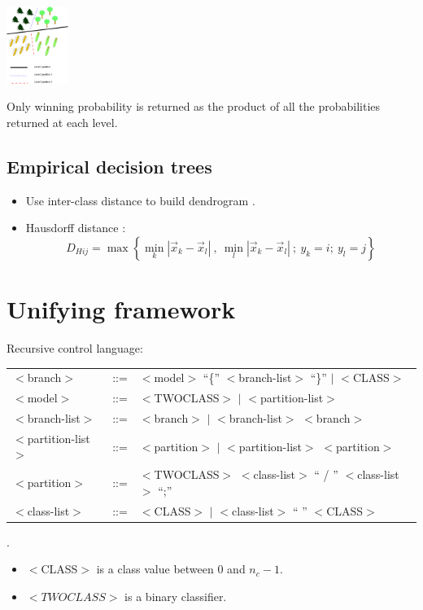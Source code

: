 \documentclass[a0,landscape]{a0poster}
\begin{document}
\begin{multicols}{4}
\includegraphics[width=0.15\textwidth]{landclasstree}

Only winning probability is returned as the
product of all the probabilities returned at each level.

\subsection*{Empirical decision trees}

\begin{itemize}
	\item Use inter-class distance to build dendrogram \citep{Benabdeslem_Bennani2006}.
	\item Hausdorff distance \citep{Ott1993}:
		\begin{equation*}
			D_{Hij} = \max \left \lbrace \min_k | \vec x_k - \vec x_l|~,~\min_l | \vec x_k - \vec x_l| ~ ;~y_k=i;~y_l=j \right \rbrace
		\end{equation*}
\end{itemize}

\section*{Unifying framework}

Recursive control language:

\begin{tabular}{lcl}
$<$branch$>$ & ::= & $<$model$>$ ``\{'' $<$branch-list$>$ ``\}'' $|$ $<$CLASS$>$\\
$<$model$>$  & ::= & $<$TWOCLASS$>$ $|$ $<$partition-list$>$\\
$<$branch-list$>$ & ::= & $<$branch$>$ $|$ $<$branch-list$>$ $<$branch$>$\\
$<$partition-list$>$ & ::= & $<$partition$>$ $|$ $<$partition-list$>$ $<$partition$>$\\
$<$partition$>$ & ::= & $<$TWOCLASS$>$ $<$class-list$>$ `` / '' $<$class-list$>$ ``;''\\
$<$class-list$>$ & ::= & $<$CLASS$>$ $|$ $<$class-list$>$ `` '' $<$CLASS$>$
\end{tabular}.

\begin{itemize}
\item $<$CLASS$>$ is a class value between $0$ and $n_c-1$.
\item $<TWOCLASS>$ is a binary classifier.
\end{itemize}


\end{multicols}
\end{document}
